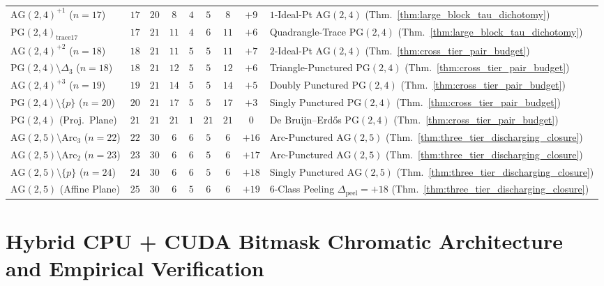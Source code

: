 \documentclass[11pt,reqno]{amsart}
\theoremstyle{definition}
\theoremstyle{remark}
\begin{document}
\begin{table}[ht]
{\begin{tabular}{lcccccccl}
    $\mathrm{AG}(2,4)^{+1}$ ($n=17$) & $17$ & $20$ & $8$ & $4$ & $5$ & $8$ & $+9$ & $1$-Ideal-Pt $\mathrm{AG}(2,4)$ (Thm.~\ref{thm:large_block_tau_dichotomy}) \\
    $\mathrm{PG}(2,4)_{\mathrm{trace17}}$ & $17$ & $21$ & $11$ & $4$ & $6$ & $11$ & $+6$ & Quadrangle-Trace $\mathrm{PG}(2,4)$ (Thm.~\ref{thm:large_block_tau_dichotomy}) \\
    $\mathrm{AG}(2,4)^{+2}$ ($n=18$) & $18$ & $21$ & $11$ & $5$ & $5$ & $11$ & $+7$ & $2$-Ideal-Pt $\mathrm{AG}(2,4)$ (Thm.~\ref{thm:cross_tier_pair_budget}) \\
    $\mathrm{PG}(2,4)\setminus\Delta_3$ ($n=18$) & $18$ & $21$ & $12$ & $5$ & $5$ & $12$ & $+6$ & Triangle-Punctured $\mathrm{PG}(2,4)$ (Thm.~\ref{thm:cross_tier_pair_budget}) \\
    $\mathrm{AG}(2,4)^{+3}$ ($n=19$) & $19$ & $21$ & $14$ & $5$ & $5$ & $14$ & $+5$ & Doubly Punctured $\mathrm{PG}(2,4)$ (Thm.~\ref{thm:cross_tier_pair_budget}) \\
    $\mathrm{PG}(2,4)\setminus\{p\}$ ($n=20$) & $20$ & $21$ & $17$ & $5$ & $5$ & $17$ & $+3$ & Singly Punctured $\mathrm{PG}(2,4)$ (Thm.~\ref{thm:cross_tier_pair_budget}) \\
    $\mathrm{PG}(2,4)$ (Proj.\ Plane) & $21$ & $21$ & $21$ & $1$ & $21$ & $21$ & $0$ & De Bruijn--Erd\H{o}s $\mathrm{PG}(2,4)$ (Thm.~\ref{thm:cross_tier_pair_budget}) \\
    $\mathrm{AG}(2,5)\setminus\mathrm{Arc}_3$ ($n=22$) & $22$ & $30$ & $6$ & $6$ & $5$ & $6$ & $+16$ & Arc-Punctured $\mathrm{AG}(2,5)$ (Thm.~\ref{thm:three_tier_discharging_closure}) \\
    $\mathrm{AG}(2,5)\setminus\mathrm{Arc}_2$ ($n=23$) & $23$ & $30$ & $6$ & $6$ & $5$ & $6$ & $+17$ & Arc-Punctured $\mathrm{AG}(2,5)$ (Thm.~\ref{thm:three_tier_discharging_closure}) \\
    $\mathrm{AG}(2,5)\setminus\{p\}$ ($n=24$) & $24$ & $30$ & $6$ & $6$ & $5$ & $6$ & $+18$ & Singly Punctured $\mathrm{AG}(2,5)$ (Thm.~\ref{thm:three_tier_discharging_closure}) \\
    $\mathrm{AG}(2,5)$ (Affine Plane) & $25$ & $30$ & $6$ & $5$ & $6$ & $6$ & $+19$ & $6$-Class Peeling $\Delta_{\mathrm{peel}}=+18$ (Thm.~\ref{thm:three_tier_discharging_closure}) \\
    \bottomrule
  \end{tabular}%
  }
\end{table}

\section{Hybrid CPU + CUDA Bitmask Chromatic Architecture and Empirical Verification}
\end{document}

